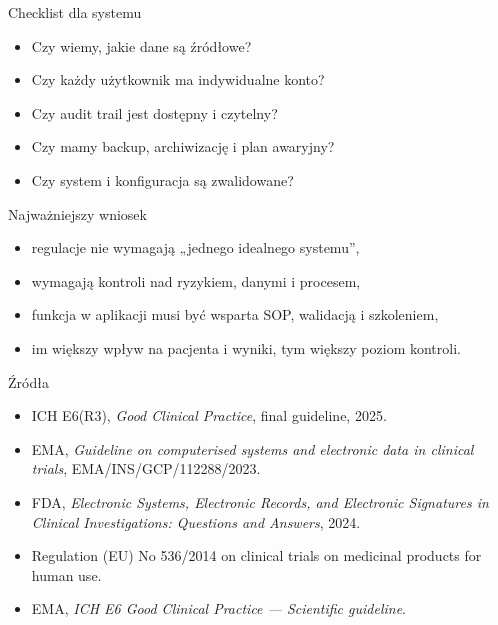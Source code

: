 \begin{frame}{Checklist dla systemu}
  \begin{itemize}
    \item Czy wiemy, jakie dane są źródłowe?
    \item Czy każdy użytkownik ma indywidualne konto?
    \item Czy audit trail jest dostępny i czytelny?
    \item Czy mamy backup, archiwizację i plan awaryjny?
    \item Czy system i konfiguracja są zwalidowane?
  \end{itemize}
\end{frame}

\begin{frame}{Najważniejszy wniosek}
  \begin{itemize}
    \item regulacje nie wymagają „jednego idealnego systemu”,
    \item wymagają kontroli nad ryzykiem, danymi i procesem,
    \item funkcja w aplikacji musi być wsparta SOP, walidacją i szkoleniem,
    \item im większy wpływ na pacjenta i wyniki, tym większy poziom kontroli.
  \end{itemize}
\end{frame}

\begin{frame}{Źródła}
  \footnotesize
  \begin{itemize}
    \item ICH E6(R3), \textit{Good Clinical Practice}, final guideline, 2025.
    \item EMA, \textit{Guideline on computerised systems and electronic data in clinical trials}, EMA/INS/GCP/112288/2023.
    \item FDA, \textit{Electronic Systems, Electronic Records, and Electronic Signatures in Clinical Investigations: Questions and Answers}, 2024.
    \item Regulation (EU) No 536/2014 on clinical trials on medicinal products for human use.
    \item EMA, \textit{ICH E6 Good Clinical Practice — Scientific guideline}.
  \end{itemize}
\end{frame}
